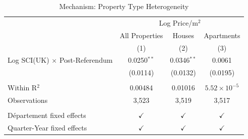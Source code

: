 
\begin{table}[htbp]
   \caption{\label{tab:property_type} Mechanism: Property Type Heterogeneity}
   \bigskip
   \centering
   \begin{tabular}{lccc}
      \toprule
       & \multicolumn{3}{c}{Log Price/m$^2$}\\
                                            & All Properties & Houses        & Apartments \\   
                                            & (1)            & (2)           & (3)\\  
      \midrule 
      Log SCI(UK) $\times$ Post-Referendum  & 0.0250$^{**}$  & 0.0346$^{**}$ & 0.0061\\   
                                            & (0.0114)       & (0.0132)      & (0.0195)\\   
       \\
      Within R$^2$                          & 0.00484        & 0.01016       & $5.52\times 10^{-5}$\\   
      Observations                          & 3,523          & 3,519         & 3,517\\  
       \\
      Département fixed effects             & $\checkmark$   & $\checkmark$  & $\checkmark$\\   
      Quarter-Year fixed effects            & $\checkmark$   & $\checkmark$  & $\checkmark$\\   
      \bottomrule
   \end{tabular}
\end{table}



